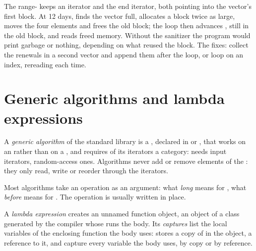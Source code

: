 \label{lst:b2:cpp-standard-library:invalidation}

\label{out:b2:cpp-standard-library:invalidation}

The range- keeps an iterator  and the end iterator, both pointing into the vector's first block.
At 12 days,  finds the vector full, allocates a block twice as large, moves the four elements and
frees the old block; the loop then advances , still in the old block, and reads freed memory. Without the
sanitizer the program would print garbage or nothing, depending on what reused the block. The fixes: collect the
renewals in a second vector and append them after the loop, or loop on an index, rereading  each time.

\section{Generic algorithms and lambda expressions}\label{sec:b2:cpp-standard-library:algorithms}

\begin{definition}\label{def:b2:cpp-standard-library:algorithm}
A \emph{generic algorithm} of the standard library is a , declared in
 or , that works on an  rather than on a , and requires of
its iterators a category:  needs input iterators,  random-access ones. Algorithms
never add or remove elements of the : they only read, write or reorder through the iterators.
\end{definition}

Most algorithms take an operation as an argument: what \emph{long} means for , what \emph{before}
means for . The operation is usually written in place.

\begin{definition}\label{def:b2:cpp-standard-library:lambda}
A \emph{lambda expression}  creates an unnamed
function object, an object of a class generated by the compiler whose  runs the body. Its
\emph{captures} list the local variables of the enclosing function the body uses:
\code{[x]} stores a copy of  in the object, \code{[&x]} a reference to it, \code{[=]} and \code{[&]} capture
every variable the body uses, by copy or by reference.
\end{definition}


